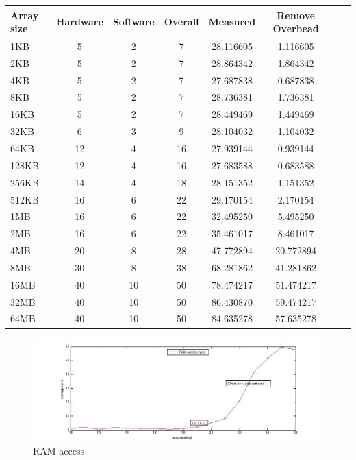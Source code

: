 \begin{center}
\begin{tabular}{l*{6}{c}r}
Array size              & Hardware  & Software  & Overall  & Measured  & Remove Overhead \\
\hline
1KB & 5 & 2 & 7 & 28.116605 & 1.116605 \\
2KB & 5 & 2 & 7 & 28.864342 &  1.864342 \\
4KB & 5 & 2 & 7 & 27.687838  & 0.687838\\
8KB & 5 & 2 & 7 & 28.736381  & 1.736381\\
16KB & 5 & 2 & 7 & 28.449469  & 1.449469 \\
32KB & 6 & 3 & 9 & 28.104032  & 1.104032 \\
64KB & 12 & 4 & 16 & 27.939144 &  0.939144\\
128KB & 12 & 4 & 16 & 27.683588 &  0.683588\\
256KB & 14 & 4 & 18 & 28.151352 &  1.151352\\
512KB & 16 & 6 & 22 & 29.170154  & 2.170154 \\
1MB & 16 & 6 & 22 & 32.495250  & 5.495250\\
2MB & 16 & 6 & 22 & 35.461017 & 8.461017 \\
4MB & 20 & 8 & 28 & 47.772894  & 20.772894\\
8MB & 30 & 8 & 38 & 68.281862  & 41.281862\\
16MB & 40 & 10 & 50 & 78.474217 & 51.474217 \\
32MB & 40 & 10 & 50 & 86.430870 & 59.474217 \\
64MB & 40 & 10 & 50 & 84.635278 & 57.635278 \\
\end{tabular}
\end{center}

\begin{figure}[htbp] %
   \centering
   \includegraphics[width=6in]{./pics/ramacc.jpg} 
   \caption{RAM access}
   \label{fig:RAM access}
\end{figure}

